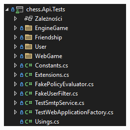 \documentclass[12pt,a4paper]{article}
\begin{document}
\vspace{1cm}

\begin{minipage}[t]{0.45\textwidth}
    \vspace{0pt}
    \centering
    \includegraphics[width=\linewidth]{zdj/struktura_back_api_tests.png} 
\end{minipage}
\hfill
\begin{minipage}[t]{0.45\textwidth}
    \vspace{0pt}
    \raggedright
    \lipsum[6] 
\end{minipage}

\vspace{1cm}
\end{document}
